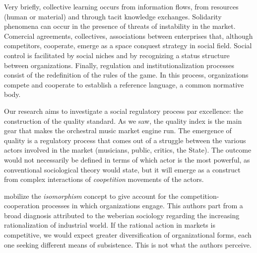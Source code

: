 \documentclass[a4paper, 12pt, openright, oneside, german, french, brazil, english]{abntex2}
\begin{document}
	Very briefly, collective learning occurs from information flows, from resources (human or material) and through tacit knowledge exchanges. Solidarity phenomena can occur in the presence of threats of instability in the market. Comercial agreements, collectives, associations between enterprises that, although competitors, cooperate, emerge as a space conquest strategy in social field. Social control is facilitated by social niches and by recognizing a status structure between organizations. Finally, regulation and institutionalization processes consist of the redefinition of the rules of the game. In this process, organizations compete and cooperate to establish a reference language, a common normative body.

        Our research aims to investigate a social regulatory process par excellence: the construction of the quality standard. As we saw, the quality index is the main gear that makes the orchestral music market engine run. The emergence of quality is a regulatory process that comes out of a struggle between the various actors involved in the market (musicians, public, critics, the State). The outcome would not necessarily be defined in terms of which actor is the most powerful, as conventional sociological theory would state, but it will emerge as a construct from complex interactions of \textit{coopetition} movements of the actors.
	
	
	 mobilize the \textit{isomorphism} concept to give account for the competition-cooperation processes in which organizations engage. This authors part from a broad diagnosis attributed to the weberian sociology regarding the increasing rationalization of industrial world. If the rational action in markets is competitive, we would expect greater diversification of organizational forms, each one seeking different means of subsistence. This is not what the authors perceive.
	
\end{document}
